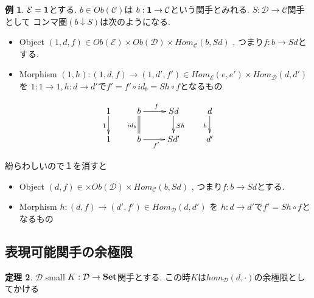 \documentclass[dvipdfmx,a4paper,11pt]{article}
\theoremstyle{definition}
\newtheorem{thm}{定理}
\newtheorem{exa}[thm]{例}
\begin{document}
\begin{exa}
$\mathcal{E}={\bf 1}$とする.
$b \in Ob(\mathcal{C})$は
$b :  {\bf 1} \to \mathcal{C}$という関手とみれる. 
$S : \mathcal{D} \to \mathcal{C}$関手として
コンマ圏$(b \downarrow S)$は次のようになる. 
\begin{itemize}
\item Object $(1,d,f) \in Ob(\mathcal{E}) \times Ob(\mathcal{D}) \times Hom_{\mathcal{C}}(b, Sd)$ , つまり$f : b \to Sd$とする. 
\item Morphism $(1,h) : (1,d,f)  \to (1,d',f') \in Hom_{\mathcal{E}}(e,e') \times Hom_{\mathcal{D}}(d,d') $ を $1 : 1 \to 1, h: d \to d'$で$f' = f' \circ id_b = Sh \circ f$となるもの
\end{itemize}

\begin{equation*}
\xymatrix@C=25pt@R=20pt{
1 \ar@{->}[d] _{1}&b\ar@{=}[d]_{id_b}  \ar@{->}[r]^{f} & Sd\ar@{->}[d]^{Sh} &d\ar@{->}[d]_{h}\\
1&b\ar@{->}[r]_{f'} &Sd'&d' \\   
}
\end{equation*}

紛らわしいので１を消すと
\begin{itemize}
\item Object $(d,f) \in \times Ob(\mathcal{D}) \times Hom_{\mathcal{C}}(b, Sd)$ , つまり$f : b \to Sd$とする. 
\item Morphism $h : (d,f)  \to (d',f') \in Hom_{\mathcal{D}}(d,d') $ を 
$h: d \to d'$で$f'  = Sh \circ f$となるもの
\end{itemize}

\end{exa}



\subsection{表現可能関手の余極限}
 \begin{tcolorbox}
 [colback = white, colframe = green!35!black, fonttitle = \bfseries,breakable = true]
\begin{thm}
$\mathcal{D}$ small 
$K : \mathcal{D} \to {\bf Set}$関手とする.
この時$K$は$hom_{\mathcal{D}}(d,\cdot)$の余極限としてかける
\end{thm}
\end{tcolorbox}
\end{document}

